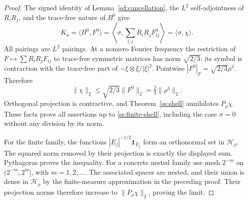 \begin{proof}
The signed identity of Lemma~\ref{sd:cancellation}, the $L^2$
self-adjointness of $R_iR_j$, and the trace-free nature of $B^0$ give
\[
 K_u=\langle B^0,F^0\rangle
     =\left\langle\sigma,\sum_{i,j}R_iR_jF^0_{ij}\right\rangle
     =\langle\sigma,\chi\rangle.
\]
All pairings are $L^2$ pairings. At a nonzero Fourier frequency the
restriction of $F\mapsto\sum R_iR_jF_{ij}$ to trace-free symmetric
matrices has norm $\sqrt{2/3}$: its symbol is contraction with the
trace-free part of $-\xi\otimes\xi/|\xi|^2$.
Pointwise $|F^0|_F=\sqrt{2/3}\rho^3$. Therefore
\[
 \|\chi\|_2\le\sqrt{2/3}\|F^0\|_2
              =\tfrac23\|\rho^3\|_2.
\]
Orthogonal projection is contractive, and Theorem~\ref{ss:shell}
annihilates $P_\rho\chi$. These facts prove all assertions up to
\eqref{ss:finite-shell}, including the case $\sigma=0$ without any
division by its norm.

For the finite family, the functions
$|E_j|^{-1/2}\mathbf1_{E_j}$ form an orthonormal set in
$\mathcal H_\rho$. The squared norm removed by their projection is
exactly the displayed sum. Pythagoras proves the inequality.
For a concrete nested family use mesh $2^{-m}$ on
$(2^{-m},2^m]$, with $m=1,2,\ldots$. The associated spaces are nested,
and their union is dense in $\mathcal H_\rho$ by the finite-measure
approximation in the preceding proof. Their projection norms therefore
increase to $\|P_\rho\chi\|_2$, proving the limit.
\end{proof}

